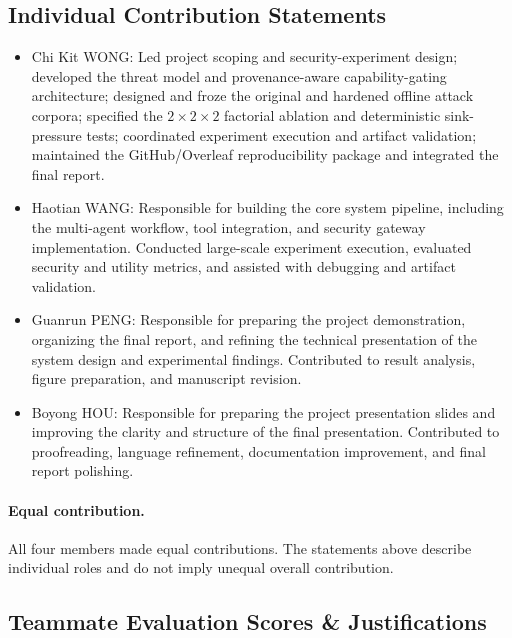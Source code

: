 \documentclass[journal]{IEEEtran}
\begin{document}
\subsection{Individual Contribution Statements}

\begin{itemize}[nosep]
  \item Chi Kit WONG: Led project scoping and security-experiment design; developed the threat model and provenance-aware capability-gating architecture; designed and froze the original and hardened offline attack corpora; specified the $2 \times 2 \times 2$ factorial ablation and deterministic sink-pressure tests; coordinated experiment execution and artifact validation; maintained the GitHub/Overleaf reproducibility package and integrated the final report.
  \item Haotian WANG: Responsible for building the core system pipeline,
including the multi-agent workflow, tool integration, and security
gateway implementation. Conducted large-scale experiment execution,
evaluated security and utility metrics, and assisted with debugging and
artifact validation.
  \item Guanrun PENG: Responsible for preparing the project demonstration,
organizing the final report, and refining the technical presentation of
the system design and experimental findings. Contributed to result
analysis, figure preparation, and manuscript revision.
  \item Boyong HOU: Responsible for preparing the project presentation slides
and improving the clarity and structure of the final presentation.
Contributed to proofreading, language refinement, documentation
improvement, and final report polishing.
\end{itemize}

\paragraph{Equal contribution.}
All four members made equal contributions. The statements above describe
individual roles and do not imply unequal overall contribution.
\subsection{Teammate Evaluation Scores \& Justifications}
\end{document}
